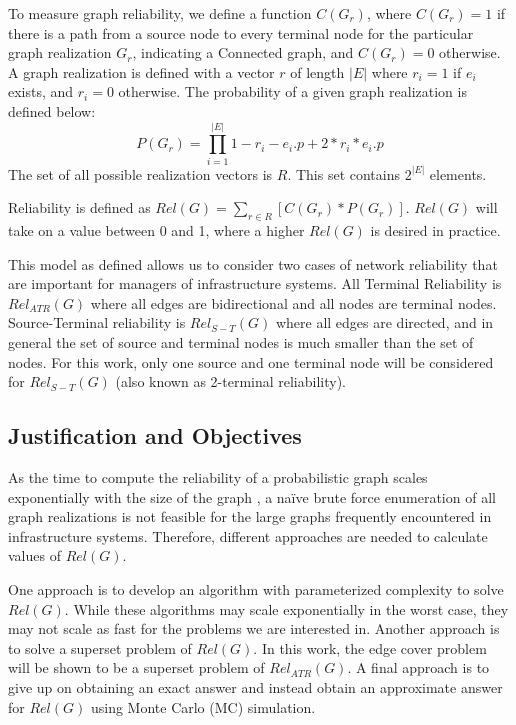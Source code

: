 \documentclass[12pt,twocolumn]{article}
\begin{document}
To measure graph reliability, we define a function \(C(G_r)\), where \(C(G_r)=1\) if there is a path from a source node to every terminal node for the particular graph realization \(G_r\), indicating a Connected graph, and \(C(G_r)=0\) otherwise. A graph realization is defined with a vector \(r\) of length \(|E|\) where \(r_i=1\) if \(e_i\) exists, and \(r_i=0\) otherwise. The probability of a given graph realization is defined below: \[P(G_r) = \prod_{i=1}^{|E|} 1-r_i-e_i.p+2*r_i*e_i.p\] The set of all possible realization vectors is \(R\). This set contains \(2^{|E|}\) elements.

Reliability is defined as \(Rel(G) = \sum_{r \in R} [C(G_r)*P(G_r)]\). \(Rel(G)\) will take on a value between 0 and 1, where a higher \(Rel(G)\) is desired in practice.

This model as defined allows us to consider two cases of network reliability that are important for managers of infrastructure systems. All Terminal Reliability is \(Rel_{ATR}(G)\) where all edges are bidirectional and all nodes are terminal nodes. Source-Terminal reliability is \(Rel_{S-T}(G)\) where all edges are directed, and in general the set of source and terminal nodes is much smaller than the set of nodes. For this work, only one source and one terminal node will be considered for \(Rel_{S-T}(G)\) (also known as 2-terminal reliability).

\hypertarget{justification-and-objectives}{%
\subsection{Justification and Objectives}\label{justification-and-objectives}}

As the time to compute the reliability of a probabilistic graph scales exponentially with the size of the graph \cite{valiant1979complexity}, a naïve brute force enumeration of all graph realizations is not feasible for the large graphs frequently encountered in infrastructure systems. Therefore, different approaches are needed to calculate values of \(Rel(G)\).

One approach is to develop an algorithm with parameterized complexity to solve \(Rel(G)\). While these algorithms may scale exponentially in the worst case, they may not scale as fast for the problems we are interested in. Another approach is to solve a superset problem of \(Rel(G)\). In this work, the edge cover problem will be shown to be a superset problem of \(Rel_{ATR}(G)\). A final approach is to give up on obtaining an exact answer and instead obtain an approximate answer for \(Rel(G)\) using Monte Carlo (MC) simulation.
\end{document}
